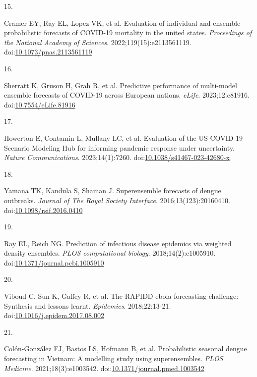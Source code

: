 \documentclass[
  letterpaper,
  DIV=11,
  numbers=noendperiod]{scrartcl}
\newlength{\cslhangindent}
\newlength{\csllabelwidth}
\newenvironment{CSLReferences}[2] %
 {\begin{list}{}{%
  \setlength{\itemindent}{0pt}
  \setlength{\leftmargin}{0pt}
  \setlength{\parsep}{0pt}
  \ifodd #1
   \setlength{\leftmargin}{\cslhangindent}
   \setlength{\itemindent}{-1\cslhangindent}
  \fi
  \setlength{\itemsep}{#2\baselineskip}}}
 {\end{list}}
\newcommand{\CSLLeftMargin}[1]{\parbox[t]{\csllabelwidth}{\strut#1\strut}}
\newcommand{\CSLRightInline}[1]{\parbox[t]{\linewidth - \csllabelwidth}{\strut#1\strut}}
\begin{document}
\begin{CSLReferences}{0}{1}
\CSLLeftMargin{15. }%
\CSLRightInline{Cramer EY, Ray EL, Lopez VK, et al. Evaluation of
individual and ensemble probabilistic forecasts of COVID-19 mortality in
the united states. \emph{Proceedings of the National Academy of
Sciences}. 2022;119(15):e2113561119.
doi:\href{https://doi.org/10.1073/pnas.2113561119}{10.1073/pnas.2113561119}}

\CSLLeftMargin{16. }%
\CSLRightInline{Sherratt K, Gruson H, Grah R, et al. Predictive
performance of multi-model ensemble forecasts of {COVID}-19 across
{European} nations. \emph{eLife}. 2023;12:e81916.
doi:\href{https://doi.org/10.7554/eLife.81916}{10.7554/eLife.81916}}

\CSLLeftMargin{17. }%
\CSLRightInline{Howerton E, Contamin L, Mullany LC, et al. Evaluation of
the {US} {COVID}-19 {Scenario} {Modeling} {Hub} for informing pandemic
response under uncertainty. \emph{Nature Communications}.
2023;14(1):7260.
doi:\href{https://doi.org/10.1038/s41467-023-42680-x}{10.1038/s41467-023-42680-x}}

\CSLLeftMargin{18. }%
\CSLRightInline{Yamana TK, Kandula S, Shaman J. Superensemble forecasts
of dengue outbreaks. \emph{Journal of The Royal Society Interface}.
2016;13(123):20160410.
doi:\href{https://doi.org/10.1098/rsif.2016.0410}{10.1098/rsif.2016.0410}}

\CSLLeftMargin{19. }%
\CSLRightInline{Ray EL, Reich NG. Prediction of infectious disease
epidemics via weighted density ensembles. \emph{PLOS computational
biology}. 2018;14(2):e1005910.
doi:\href{https://doi.org/10.1371/journal.pcbi.1005910}{10.1371/journal.pcbi.1005910}}

\CSLLeftMargin{20. }%
\CSLRightInline{Viboud C, Sun K, Gaffey R, et al. The RAPIDD ebola
forecasting challenge: Synthesis and lessons learnt. \emph{Epidemics}.
2018;22:13-21.
doi:\href{https://doi.org/10.1016/j.epidem.2017.08.002}{10.1016/j.epidem.2017.08.002}}

\CSLLeftMargin{21. }%
\CSLRightInline{Colón-González FJ, Bastos LS, Hofmann B, et al.
Probabilistic seasonal dengue forecasting in {Vietnam}: {A} modelling
study using superensembles. \emph{PLOS Medicine}. 2021;18(3):e1003542.
doi:\href{https://doi.org/10.1371/journal.pmed.1003542}{10.1371/journal.pmed.1003542}}


\end{CSLReferences}
\end{document}
